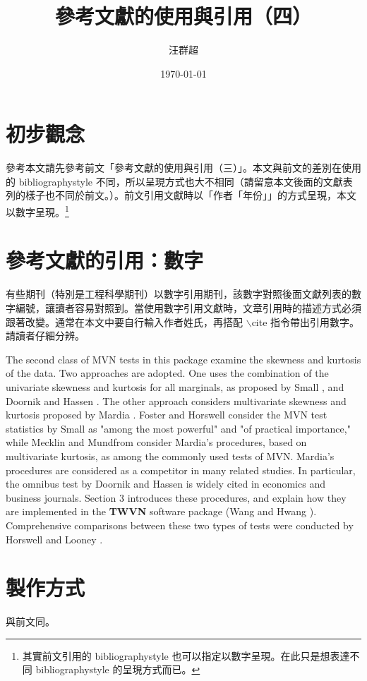 \title{ {\MB 參考文獻的使用與引用（四）}}		%
\author{{\SM 汪群超}}						%
\date{{\TT \today }} 							 

\maketitle
\fontsize{12}{22pt}\selectfont %
\section{初步觀念}
參考本文請先參考前文「參考文獻的使用與引用（三）」。本文與前文的差別在使用的 bibliographystyle 不同，所以呈現方式也大不相同（請留意本文後面的文獻表列的樣子也不同於前文。）。前文引用文獻時以「作者「年份」」的方式呈現，本文以數字呈現。\footnote{其實前文引用的 bibliographystyle 也可以指定以數字呈現。在此只是想表達不同 bibliographystyle 的呈現方式而已。}

\section{參考文獻的引用：數字} 
有些期刊（特別是工程科學期刊）以數字引用期刊，該數字對照後面文獻列表的數字編號，讓讀者容易對照到。當使用數字引用文獻時，文章引用時的描述方式必須跟著改變。通常在本文中要自行輸入作者姓氏，再搭配 $\backslash$cite 指令帶出引用數字。請讀者仔細分辨。

{\T The second class of MVN tests in this package examine the skewness and kurtosis of the data. Two approaches are adopted. One uses the combination of the univariate skewness and kurtosis for all marginals, as proposed by Small \cite{SMALL:1980}, and Doornik and Hassen \cite{DOORNIK:2008}. The other approach considers multivariate skewness and kurtosis proposed by Mardia \cite{MARDIA:1970}.   Foster \cite{FOSTER:1981} and Horswell \cite{HORSWELL:1990} consider the MVN test statistics by Small as "among the most powerful" and "of practical importance,"  while  Mecklin and Mundfrom \cite{MM} consider Mardia's procedures, based on multivariate kurtosis, as among the commonly used tests of MVN.  Mardia's procedures are considered as a competitor  in many related studies.
In particular, the omnibus test by  Doornik and Hassen \cite{DOORNIK:2008} is widely cited in economics and business journals. Section 3 introduces these procedures, and explain how they are implemented in the \textbf{TWVN} software package (Wang and Hwang \cite{WH}). Comprehensive  comparisons between these two types of tests were conducted by Horswell and Looney \cite{HORSWELL:1992}.}

\section{製作方式}
與前文同。

%
%
%
%
%
%





